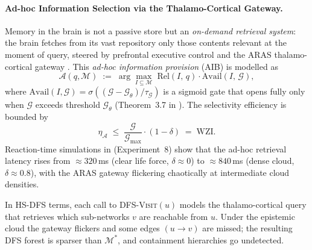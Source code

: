 ﻿\documentclass[12pt,a4paper]{article}
\theoremstyle{plain}
\theoremstyle{definition}
\theoremstyle{remark}
\begin{document}
	\paragraph{Ad-hoc Information Selection via the Thalamo-Cortical Gateway.}
	Memory in the brain is not a passive store but an \emph{on-demand
		retrieval system}: the brain fetches from its vast repository only
	those contents relevant at the moment of query, steered by prefrontal
	executive control and the ARAS thalamo-cortical gateway
	\cite{epp2026brain}.  This \emph{ad-hoc information provision} (AIB) is
	modelled as
	\[
	\mathcal{A}(q, \mathcal{M})
	\;:=\; \arg\max_{I \subseteq \mathcal{M}}\;
	\mathrm{Rel}(I,\,q) \cdot \mathrm{Avail}(I,\,\mathcal{G}),
	\]
	where $\mathrm{Avail}(I,\mathcal{G}) = \sigma((\mathcal{G} -
	\mathcal{G}_\theta)/\tau_\mathcal{G})$ is a sigmoid gate that opens
	fully only when $\mathcal{G}$ exceeds threshold $\mathcal{G}_\theta$
	(Theorem~3.7 in \cite{epp2026brain}).  The selectivity efficiency is
	bounded by
	\[
	\eta_{\mathcal{A}} \;\leq\;
	\frac{\mathcal{G}}{\mathcal{G}_{\max}}\cdot(1-\delta) \;=\;\mathrm{WZI}.
	\]
	Reaction-time simulations in \cite{epp2026brain} (Experiment~8) show
	that the ad-hoc retrieval latency rises from $\approx 320$\,ms (clear
	life force, $\delta \approx 0$) to $\approx 840$\,ms (dense cloud,
	$\delta \approx 0.8$), with the ARAS gateway flickering chaotically at
	intermediate cloud densities.
	
	In HS-DFS terms, each call to \textsc{DFS-Visit}$(u)$ models the
	thalamo-cortical query that retrieves which sub-networks $v$ are
	reachable from $u$.  Under the epistemic cloud the gateway flickers and
	some edges $(u \to v)$ are missed; the resulting DFS forest is sparser
	than $\mathcal{M}^*$, and containment hierarchies go undetected.
	
\end{document}
